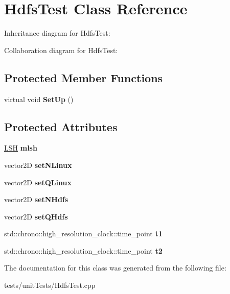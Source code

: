 \hypertarget{classHdfsTest}{}\section{Hdfs\+Test Class Reference}
\label{classHdfsTest}


Inheritance diagram for Hdfs\+Test\+:


Collaboration diagram for Hdfs\+Test\+:
\subsection*{Protected Member Functions}
\begin{DoxyCompactItemize}
\item 
virtual void {\bfseries Set\+Up} ()\hypertarget{classHdfsTest_a4a1b342a070d45055117ae08f03fc31c}{}\label{classHdfsTest_a4a1b342a070d45055117ae08f03fc31c}

\end{DoxyCompactItemize}
\subsection*{Protected Attributes}
\begin{DoxyCompactItemize}
\item 
\hyperlink{classLSH}{L\+SH} {\bfseries mlsh}\hypertarget{classHdfsTest_a76e39e43b4557da8b43480bb0f732f60}{}\label{classHdfsTest_a76e39e43b4557da8b43480bb0f732f60}

\item 
vector2D {\bfseries set\+N\+Linux}\hypertarget{classHdfsTest_a6e9795235017e39065cf23bfd1efdb0b}{}\label{classHdfsTest_a6e9795235017e39065cf23bfd1efdb0b}

\item 
vector2D {\bfseries set\+Q\+Linux}\hypertarget{classHdfsTest_a87f92c6218e9c36b473ab56cdd9a9662}{}\label{classHdfsTest_a87f92c6218e9c36b473ab56cdd9a9662}

\item 
vector2D {\bfseries set\+N\+Hdfs}\hypertarget{classHdfsTest_a43d84d2996fa6480b84dc31e69119f7d}{}\label{classHdfsTest_a43d84d2996fa6480b84dc31e69119f7d}

\item 
vector2D {\bfseries set\+Q\+Hdfs}\hypertarget{classHdfsTest_a04de5e85c87358316d2106ee9647ad5b}{}\label{classHdfsTest_a04de5e85c87358316d2106ee9647ad5b}

\item 
std\+::chrono\+::high\+\_\+resolution\+\_\+clock\+::time\+\_\+point {\bfseries t1}\hypertarget{classHdfsTest_af15219a62cfd0bc7dd41d9b2a3dde42a}{}\label{classHdfsTest_af15219a62cfd0bc7dd41d9b2a3dde42a}

\item 
std\+::chrono\+::high\+\_\+resolution\+\_\+clock\+::time\+\_\+point {\bfseries t2}\hypertarget{classHdfsTest_a802e2abaadec3f899873c13e628a152e}{}\label{classHdfsTest_a802e2abaadec3f899873c13e628a152e}

\end{DoxyCompactItemize}


The documentation for this class was generated from the following file\+:\begin{DoxyCompactItemize}
\item 
tests/unit\+Tests/Hdfs\+Test.\+cpp\end{DoxyCompactItemize}

